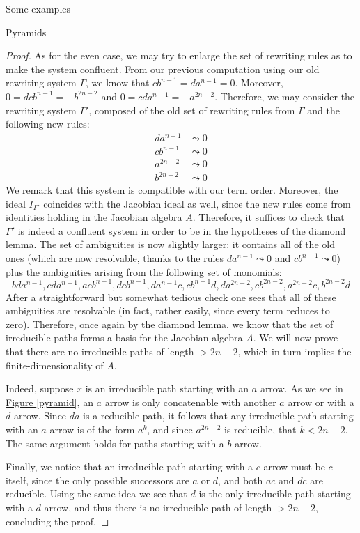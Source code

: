 \begin{chapter}{Some examples}
\begin{section}{Pyramids}
\begin{proof}
As for the even case, we may try to enlarge the set of rewriting rules as to make the system confluent. From our previous computation using our old rewriting system $\Gamma$, we know that $cb^{n-1}=da^{n-1}=0$. Moreover,  $0=dcb^{n-1}=-b^{2n-2}$ and  $0=cda^{n-1}=-a^{2n-2}$. Therefore, we may consider the rewriting system $\Gamma'$, composed of the old set of rewriting rules from $\Gamma$ and the following new rules:
\begin{align*}
da^{n-1} &\leadsto 0 \\
cb^{n-1} &\leadsto 0\\
a^{2n-2} &\leadsto 0\\
b^{2n-2} &\leadsto 0
\end{align*}
We remark that this system is compatible with our term order. Moreover, the ideal $I_{\Gamma'}$ coincides with the Jacobian ideal as well, since the new rules come from identities holding in the Jacobian algebra $A$. Therefore, it suffices to check that $\Gamma'$ is indeed a confluent system in order to be in the hypotheses of the diamond lemma. The set of ambiguities is now slightly larger: it contains all of the old ones (which are now resolvable, thanks to the rules $da^{n-1} \leadsto 0$ and $cb^{n-1} \leadsto 0$) plus the ambiguities arising from the following set of monomials:
\[bda^{n-1}, cda^{n-1}, acb^{n-1}, dcb^{n-1}, da^{n-1}c, cb^{n-1}d, da^{2n-2}, cb^{2n-2}, a^{2n-2}c, b^{2n-2}d\]
After a straightforward but somewhat tedious check one sees that all of these ambiguities are resolvable (in fact, rather easily, since every term reduces to zero). Therefore, once again by the diamond lemma, we know that the set of irreducible paths forms a basis for the Jacobian algebra $A$. We will now prove that there are no irreducible paths of length $>2n-2$, which in turn implies the finite-dimensionality of $A$.

Indeed, suppose $x$ is an irreducible path starting with an $a$ arrow. As we see in \hyperref[pyramid]{Figure \ref*{pyramid}}, an $a$ arrow is only concatenable with another $a$ arrow or with a $d$ arrow. Since $da$ is a reducible path, it follows that any irreducible path starting with an $a$ arrow is of the form $a^k$, and since $a^{2n-2}$ is reducible, that $k<2n-2$. The same argument holds for paths starting with a $b$ arrow.

Finally, we notice that an irreducible path starting with a $c$ arrow must be $c$ itself, since the only possible successors are $a$ or $d$, and both $ac$ and $dc$ are reducible. Using the same idea we see that $d$ is the only irreducible path starting with a $d$ arrow, and thus there is no irreducible path of length $>2n-2$, concluding the proof.
\end{proof}
\end{section}
\end{chapter}